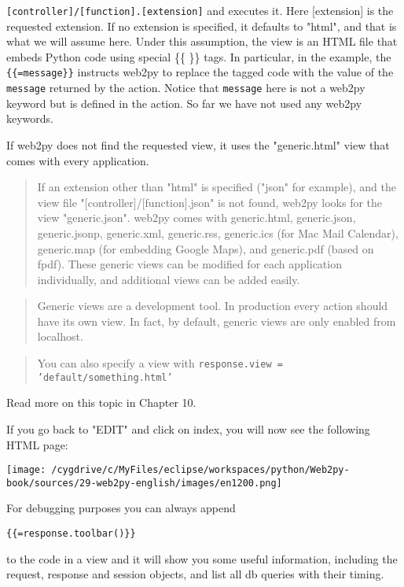 \documentclass[justified,sixbynine,notoc]{tufte-book}
\def\ft{\small\tt}
\def\inxx#1{\index{#1}}
\begin{document}
\begin{fullwidth}
{\ft [controller]/[function].[extension]}
\noindent and executes it. Here [extension] is the requested extension. If no extension is specified, it defaults to "html", and that is what we will assume here. Under this assumption, the view is an HTML file that embeds Python code using special \{\{ \}\} tags. In particular, in the example, the {\ft \{\{=message\}\}} instructs web2py to replace the tagged code with the value of the {\ft message} returned by the action. Notice that {\ft message} here is not a web2py keyword but is defined in the action. So far we have not used any web2py keywords.

If web2py does not find the requested view, it uses the "generic.html" view that comes with every application.

\begin{quote}\inxx{Mac Mail} \inxx{Google Maps} \inxx{jsonp}
If an extension other than "html" is specified ("json" for example), and the view file "[controller]/[function].json" is not found, web2py looks for the view "generic.json". web2py comes with generic.html, generic.json, generic.jsonp, generic.xml, generic.rss, generic.ics (for Mac Mail Calendar), generic.map (for embedding Google Maps), and generic.pdf (based on fpdf). These generic views can be modified for each application individually, and additional views can be added easily.\end{quote}
\begin{quote}Generic views are a development tool. In production every action should have its own view. In fact, by default, generic views are only enabled from localhost.\end{quote}
\begin{quote}You can also specify a view with {\ft response.view = 'default/something.html'}\end{quote}
Read more on this topic in Chapter 10.

If you go back to "EDIT" and click on index, you will now see the following HTML page:


\goodbreak\begin{center}\texttt{[image: /cygdrive/c/MyFiles/eclipse/workspaces/python/Web2py-book/sources/29-web2py-english/images/en1200.png]}\end{center}


For debugging purposes you can always append

\begin{lstlisting}[keywords={}]
{{=response.toolbar()}}
\end{lstlisting}
\noindent to the code in a view and it will show you some useful information, including the request, response and session objects, and list all db queries with their timing.


\end{fullwidth}
\end{document}
